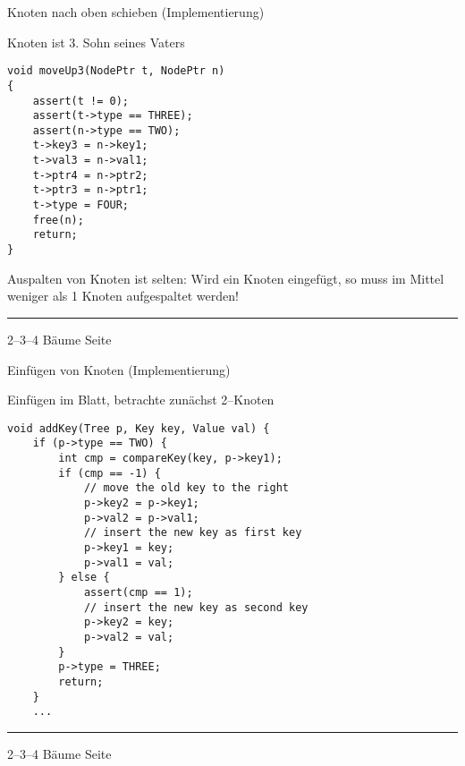 
\begin{slide}{}
\normalsize

\begin{center}
Knoten nach oben schieben (Implementierung)
\end{center}
\vspace*{0.5cm}

\footnotesize
Knoten ist 3. Sohn seines Vaters
\begin{verbatim}
void moveUp3(NodePtr t, NodePtr n) 
{
    assert(t != 0);
    assert(t->type == THREE);
    assert(n->type == TWO);
    t->key3 = n->key1;
    t->val3 = n->val1;
    t->ptr4 = n->ptr2;
    t->ptr3 = n->ptr1;
    t->type = FOUR;
    free(n);
    return;
}
\end{verbatim}

Auspalten von Knoten ist selten:
Wird ein Knoten eingef\"ugt, so muss im Mittel weniger als 1 Knoten 
aufgespaltet werden!

\vspace*{\fill}
\tiny \addtocounter{mypage}{1}
\rule{17cm}{1mm}
2--3--4 B\"aume  \hspace*{\fill} Seite 
\end{slide}


\begin{slide}{}
\normalsize

\begin{center}
Einf\"ugen von Knoten (Implementierung)
\end{center}
\vspace*{0.5cm}

\footnotesize
Einf\"ugen im Blatt, betrachte zun\"achst 2--Knoten


\begin{verbatim}
void addKey(Tree p, Key key, Value val) {
    if (p->type == TWO) {
        int cmp = compareKey(key, p->key1);
        if (cmp == -1) {
            // move the old key to the right
            p->key2 = p->key1;
            p->val2 = p->val1;
            // insert the new key as first key
            p->key1 = key;
            p->val1 = val;
        } else {
            assert(cmp == 1);
            // insert the new key as second key
            p->key2 = key;
            p->val2 = val;
        }
        p->type = THREE;
        return;
    }
    ...
\end{verbatim}

\vspace*{\fill}
\tiny \addtocounter{mypage}{1}
\rule{17cm}{1mm}
2--3--4 B\"aume  \hspace*{\fill} Seite 
\end{slide}


